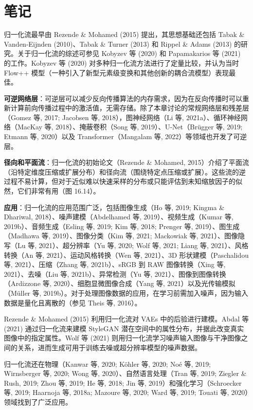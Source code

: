\documentclass[lang=cn,newtx,10pt,scheme=chinese]{elegantbook}
\begin{document}
\section{笔记}
归一化流最早由 Rezende \& Mohamed (2015) 提出，其思想基础还包括 Tabak \& Vanden-Eijnden (2010)、Tabak \& Turner (2013) 和 Rippel \& Adams (2013) 的研究。关于归一化流的综述可参见 Kobyzev 等 (2020) 和 Papamakarios 等 (2021) 的工作。Kobyzev 等 (2020) 对多种归一化流方法进行了定量比较，并认为当时 Flow++ 模型（一种引入了新型元素级变换和其他创新的耦合流模型）表现最佳。

\textbf{可逆网络层}：可逆层可以减少反向传播算法的内存需求，因为在反向传播时可以重新计算前向传播过程中的激活值，无需存储。除了本章讨论的常规网络层和残差层（Gomez 等, 2017; Jacobsen 等, 2018），图神经网络（Li 等, 2021a）、循环神经网络（MacKay 等, 2018）、掩蔽卷积（Song 等, 2019）、U-Net（Brügger 等, 2019; Etmann 等, 2020）以及 Transformer（Mangalam 等, 2022）等领域也开发了可逆层。

\textbf{径向和平面流}：归一化流的初始论文（Rezende \& Mohamed, 2015）介绍了平面流（沿特定维度压缩或扩展分布）和径向流（围绕特定点压缩或扩展）。这些流的逆过程不易计算，但对于近似难以快速采样的分布或只能评估到未知缩放因子的似然，它们非常有用（图 16.14）。

\textbf{应用}：归一化流的应用范围广泛，包括图像生成（Ho 等, 2019; Kingma \& Dhariwal, 2018）、噪声建模（Abdelhamed 等, 2019）、视频生成（Kumar 等, 2019b）、音频生成（Esling 等, 2019; Kim 等, 2018; Prenger 等, 2019）、图生成（Madhawa 等, 2019）、图像分类（Kim 等, 2021; Mackowiak 等, 2021）、图像隐写（Lu 等, 2021）、超分辨率（Yu 等, 2020; Wolf 等, 2021; Liang 等, 2021）、风格转换（An 等, 2021）、运动风格转换（Wen 等, 2021）、3D 形状建模（Paschalidou 等, 2021）、压缩（Zhang 等, 2021b）、sRGB 到 RAW 图像转换（Xing 等, 2021）、去噪（Liu 等, 2021b）、异常检测（Yu 等, 2021）、图像到图像转换（Ardizzone 等, 2020）、细胞显微图像合成（Yang 等, 2021）以及光传输模拟（Müller 等, 2019b）。对于处理图像数据的应用，在学习前需加入噪声，因为输入数据是量化且离散的（参见 Theis 等, 2016）。

Rezende \& Mohamed (2015) 利用归一化流对 VAEs 中的后验进行建模。Abdal 等 (2021) 通过归一化流来建模 StyleGAN 潜在空间中的属性分布，并据此改变真实图像中的指定属性。Wolf 等 (2021) 则用归一化流学习噪声输入图像与干净图像之间的关系，进而生成可用于训练去噪或超分辨率模型的噪声数据。

归一化流还在物理（Kanwar 等, 2020; Köhler 等, 2020; Noé 等, 2019; Wirnsberger 等, 2020; Wong 等, 2020）、自然语言处理（Tran 等, 2019; Ziegler \& Rush, 2019; Zhou 等, 2019; He 等, 2018; Jin 等, 2019）和强化学习（Schroecker 等, 2019; Haarnoja 等, 2018a; Mazoure 等, 2020; Ward 等, 2019; Touati 等, 2020）领域找到了广泛应用。
\end{document}
